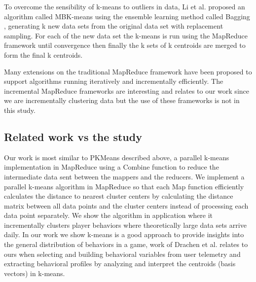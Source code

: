 To overcome the sensibility of k-means to outliers in data, Li et al. \citep{Li:2011} proposed an algorithm called MBK-means using the ensemble learning method called Bagging \citep{Breiman:1996}, generating k new data sets from the original data set with replacement sampling. For each of the new data set the k-means is run using the MapReduce framework until convergence then finally the k sets of k centroids are merged to form the final k centroids. 

Many extensions on the traditional MapReduce framework have been proposed to support algorithms running iteratively \citep{Condie:2010HadoopOnline, Ekanayake:2010Twister, Zaharia:2010Spark, Bu:2010HaLoop, Bu:2012HaLoop, Yan:2012IncMr} and incrementally \citep{Bhatotia:2011Incoop, Yan:2012IncMr, Bhatotia:2012Slider} efficiently. The incremental MapReduce frameworks are interesting and relates to our work since we are incrementally clustering data but the use of these frameworks is not in this study.

\subsection{Related work vs the study}
Our work is most similar to PKMeans \citep{Zhao:2009} described above, a parallel k-means implementation in MapReduce using a Combine function to reduce the intermediate data sent between the mappers and the reducers. We implement a parallel k-means algorithm in MapReduce so that each Map function efficiently calculates the distance to nearest cluster centers by calculating the distance matrix between all data points and the cluster centers instead of processing each data point separately. We show the algorithm in application where it incrementally clusters player behaviors where theoretically large data sets arrive daily. In our work we show k-means is a good approach to provide insights into the general distribution of behaviors in a game, work of Drachen et al. \citep{Drachen:2012, Drachen:2013} relates to ours when selecting and building behavioral variables from user telemetry and extracting behavioral profiles by analyzing and interpret the centroids (basis vectors) in k-means.